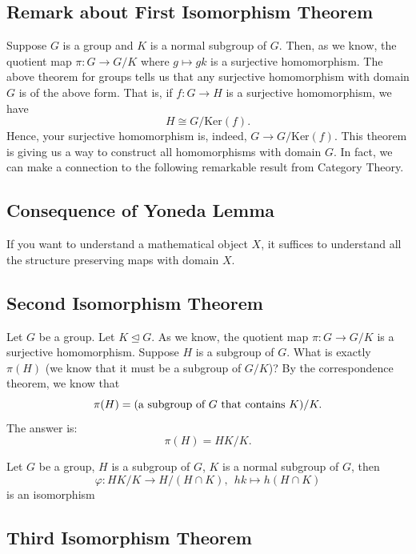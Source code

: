 \begin{remark}
\end{remark}

\subsection{Remark about First Isomorphism Theorem}

    Suppose \( G  \) is a group and \( K  \) is a normal subgroup of \( G  \). Then, as we know, the quotient map \( \pi : G \to G / K  \) where \( g \mapsto g k  \) is a surjective homomorphism. The above theorem for groups tells us that any surjective homomorphism with domain \( G  \) is of the above form. That is, if \( f : G \to H  \) is a surjective homomorphism, we have  
    \[  H \cong G / \text{Ker}(f). \]
    Hence, your surjective homomorphism is, indeed, \( G \to G / \text{Ker}(f) \). This theorem is giving us a way to construct all homomorphisms with domain \( G  \). In fact, we can make a connection to the following remarkable result from Category Theory.

\subsection{Consequence of Yoneda Lemma}

If you want to understand a mathematical object \( X  \), it suffices to understand all the structure preserving maps with domain \( X  \).

\subsection{Second Isomorphism Theorem}

Let \( G  \) be a group. Let \(  K \trianglelefteq G  \). As we know, the quotient map \( \pi : G \to G / K  \) is a surjective homomorphism. Suppose \( H  \) is a subgroup of \( G  \). What is exactly \( \pi(H) \) (we know that it must be a subgroup of \( G / K  \))? By the correspondence theorem, we know that    
\[  \pi(H) = (\text{a subgroup of \( G  \) that contains \(  K  \)} ) / K.  \]
The answer is:
\[  \pi(H) = HK / K.   \]


\begin{theorem}
Let \( G  \) be a group, \( H  \) is a subgroup of \( G  \), \( K  \) is a normal subgroup of \( G  \), then 
\[  \varphi : HK / K \to H / (H \cap K) , \ \ hk \mapsto h (H \cap K ) \]
is an isomorphism
\end{theorem}

\subsection{Third Isomorphism Theorem}

